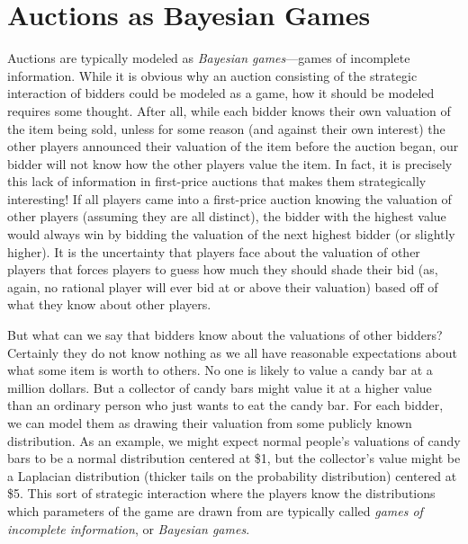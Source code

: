 \documentclass[12pt,twoside]{reedthesis}
\begin{document}
\section{Auctions as Bayesian Games}
Auctions are typically modeled as {\em Bayesian games}---games of incomplete information. While it is obvious why an auction consisting of the strategic interaction of bidders could be modeled as a game, how it should be modeled requires some thought. After all, while each bidder knows their own valuation of the item being sold, unless for some reason (and against their own interest) the other players announced their valuation of the item before the auction began, our bidder will not know how the other players value the item. In fact, it is precisely this lack of information in first-price auctions that makes them strategically interesting! If all players came into a first-price auction knowing the valuation of other players (assuming they are all distinct), the bidder with the highest value would always win by bidding the valuation of the next highest bidder (or slightly higher). It is the uncertainty that players face about the valuation of other players that forces players to guess how much they should shade their bid (as, again, no rational player will ever bid at or above their valuation) based off of what they know about other players. 

But what can we say that bidders know about the valuations of other bidders? Certainly they do not know nothing as we all have reasonable expectations about what some item is worth to others. No one is likely to value a candy bar at a million dollars. But a collector of candy bars might value it at a higher value than an ordinary person who just wants to eat the candy bar. For each bidder, we can model them as drawing their valuation from some publicly known distribution. As an example, we might expect normal people's valuations of candy bars to be a normal distribution centered at \$1, but the collector's value might be a Laplacian distribution (thicker tails on the probability distribution) centered at \$5. This sort of strategic interaction where the players know the distributions which parameters of the game are drawn from are typically called {\em games of incomplete information}, or {\em Bayesian games}.

\label{section:AuctionsAsBayes}
 
\end{document}
